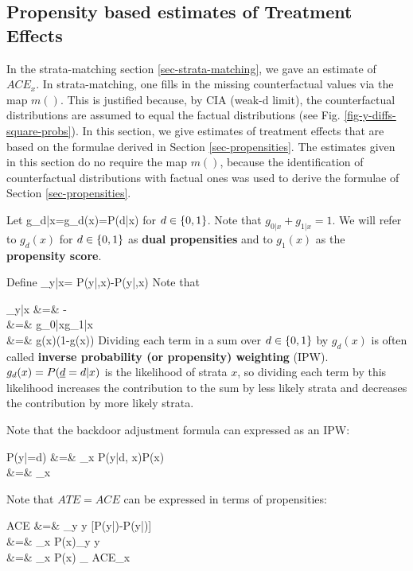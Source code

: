 \subsection{Propensity based  estimates of
Treatment Effects}

In the  strata-matching
section \ref{sec-strata-matching}, we gave an estimate
of $ACE_x$.
In strata-matching, one
fills in the missing
counterfactual values
via the map $m()$.
This is justified
because,
by CIA (weak-d limit),
the counterfactual
distributions
are assumed to equal
the factual distributions (see Fig.
\ref{fig-y-diffs-square-probs}).
In this
section,
we give estimates
of treatment effects that
are based on the  formulae derived
in Section \ref{sec-propensities}.
The estimates given in this section
do no require
the map $m()$, because
the identification of
counterfactual distributions
with factual ones was used to
derive the formulae
of  Section \ref{sec-propensities}.

Let
\beq
g_{d|x}=g_d(x)=P(d|x)
\eeq
 for $d\in\{0,1\}$.
Note that $g_{0|x}+g_{1|x}=1$.
We will
refer to $g_d(x)$
for $d\in \{0,1\}$
as {\bf dual propensities}
and to $g_1(x)$ as the
{\bf propensity score}.

Define
\beq
\delta_{y|x}=
P(y|,x)-P(y|,x)
\eeq
Note that

\beqa
\delta_{y|x}
&=&
-
\\
&=&
{
g_{0|x}g_{1|x}
}
\\
&=&
{
g(x)(1-g(x))
}
\eeqa
Dividing
each term
in a sum over $d\in \{0,1\}$
by $g_ d(x)$
is often called
 {\bf inverse probability (or propensity)
weighting} (IPW).
$g_ d(x)=P(\rvd= d|x)$ is the
likelihood of strata $x$,
so dividing each term by
this likelihood increases the
contribution to the sum
by less likely strata
and decreases the contribution by
more likely strata.




Note that the
backdoor adjustment formula
can  expressed
as an IPW:



\beqa
P(y|\cald\rvd=d)
&=&
\sum_x P(y|d, x)P(x)
\\
&=&
\sum_x 
\eeqa

Note that $ATE=ACE$ can be expressed
in terms of propensities:



\beqa
ACE
&=&
\sum_y y [P(y|\cald{})-P(y|\cald{})]
\\
&=&
\sum_x P(x)\sum_y y
\left[
P(y|d=1,x)
-
P(y|d=0,x)
\right]
\\&=&
\sum_x P(x)
_
{ACE_x}
\label{eq-ace-propensity}
\eeqa



